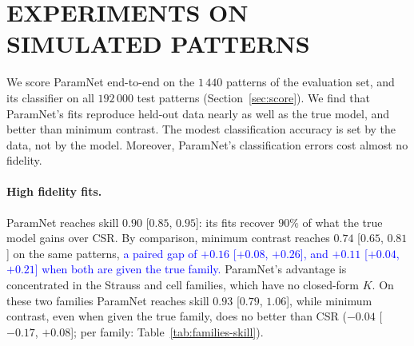 \documentclass[twoside]{article}
\newcommand{\review}[1]{\textcolor{blue}{#1}}
\begin{document}

\section{EXPERIMENTS ON SIMULATED PATTERNS}
\label{sec:analysis}

We score ParamNet end-to-end on the $1\,440$ patterns of the evaluation set, and its classifier on all
$192\,000$ test patterns (Section~\ref{sec:score}). We find that ParamNet's fits reproduce held-out data nearly as well as the true model, and better than minimum contrast. The modest classification accuracy is set by the data, not by the model. Moreover, ParamNet's classification errors cost almost no fidelity.

\begin{table}[t]
\caption{Main results. \emph{Identification}: balanced accuracy over the eight families on the $192\,000$ test
patterns, on all of them and in the structured regime ($\tau{=}0.9$), and over the four mechanisms (CSR, clustered,
regular, cell) at $\tau{=}0.9$; intervals are within $\pm0.003$. Minimum contrast never selects Strauss or cell.
\emph{Fidelity}: skill on the $1\,439$ scored patterns ($1$: as good as the true model; $0$: no better than CSR), given
the predicted family, given the true family, and on the non-Poisson patterns routed to a wrong family. $\Delta$:
ParamNet $-$ minimum contrast, paired, overall and by whether minimum contrast can fit the family. Intervals are $95\%$
bootstrap over patterns; higher is better. Accuracy is modest, yet the fits recover $90\%$ of the true model's gain.}
\label{tab:main}
\begin{center}
\footnotesize
\setlength{\tabcolsep}{4pt}

\end{center}
\end{table}

\paragraph{High fidelity fits.}
ParamNet reaches skill $0.90$ [$0.85$, $0.95$]: its fits recover $90\%$ of what the true model gains over CSR.
By comparison, minimum contrast reaches $0.74$ [$0.65$, $0.81$] on the same patterns, \review{a paired gap of $+0.16$ [$+0.08$, $+0.26$], and $+0.11$ [$+0.04$, $+0.21$] when both are given the true family.} ParamNet's advantage is concentrated in the Strauss and cell families, which have no closed-form $K$. On these two families ParamNet reaches skill $0.93$ [$0.79$, $1.06$], while minimum contrast, even when given the true family, does no better than CSR ($-0.04$ [$-0.17$, $+0.08$]; per family:
Table~\ref{tab:families-skill}). 
\end{document}
